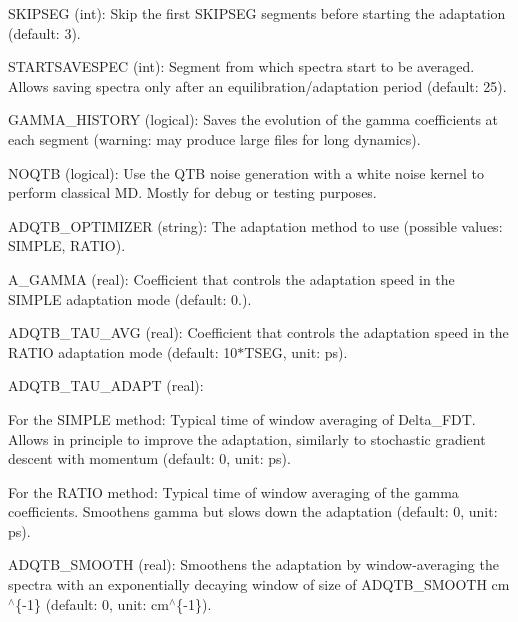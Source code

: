 \begin{DoxyItemize}
\item {\ttfamily S\-K\-I\-P\-S\-E\-G} (int)\-: Skip the first {\ttfamily S\-K\-I\-P\-S\-E\-G} segments before starting the adaptation (default\-: 3).
\item {\ttfamily S\-T\-A\-R\-T\-S\-A\-V\-E\-S\-P\-E\-C} (int)\-: Segment from which spectra start to be averaged. Allows saving spectra only after an equilibration/adaptation period (default\-: 25).
\item {\ttfamily G\-A\-M\-M\-A\-\_\-\-H\-I\-S\-T\-O\-R\-Y} (logical)\-: Saves the evolution of the gamma coefficients at each segment (warning\-: may produce large files for long dynamics).
\item {\ttfamily N\-O\-Q\-T\-B} (logical)\-: Use the Q\-T\-B noise generation with a white noise kernel to perform classical M\-D. Mostly for debug or testing purposes.
\item {\ttfamily A\-D\-Q\-T\-B\-\_\-\-O\-P\-T\-I\-M\-I\-Z\-E\-R} (string)\-: The adaptation method to use (possible values\-: {\ttfamily S\-I\-M\-P\-L\-E}, {\ttfamily R\-A\-T\-I\-O}).
\item {\ttfamily A\-\_\-\-G\-A\-M\-M\-A} (real)\-: Coefficient that controls the adaptation speed in the {\ttfamily S\-I\-M\-P\-L\-E} adaptation mode (default\-: 0.).
\item {\ttfamily A\-D\-Q\-T\-B\-\_\-\-T\-A\-U\-\_\-\-A\-V\-G} (real)\-: Coefficient that controls the adaptation speed in the {\ttfamily R\-A\-T\-I\-O} adaptation mode (default\-: 10$\ast${\ttfamily T\-S\-E\-G}, unit\-: ps).
\item {\ttfamily A\-D\-Q\-T\-B\-\_\-\-T\-A\-U\-\_\-\-A\-D\-A\-P\-T} (real)\-:
\begin{DoxyItemize}
\item For the {\ttfamily S\-I\-M\-P\-L\-E} method\-: Typical time of window averaging of Delta\-\_\-\-F\-D\-T. Allows in principle to improve the adaptation, similarly to stochastic gradient descent with momentum (default\-: 0, unit\-: ps).
\item For the {\ttfamily R\-A\-T\-I\-O} method\-: Typical time of window averaging of the gamma coefficients. Smoothens gamma but slows down the adaptation (default\-: 0, unit\-: ps).
\end{DoxyItemize}
\item {\ttfamily A\-D\-Q\-T\-B\-\_\-\-S\-M\-O\-O\-T\-H} (real)\-: Smoothens the adaptation by window-\/averaging the spectra with an exponentially decaying window of size of {\ttfamily A\-D\-Q\-T\-B\-\_\-\-S\-M\-O\-O\-T\-H} cm$^\wedge$\{-\/1\} (default\-: 0, unit\-: cm$^\wedge$\{-\/1\}).

\end{DoxyItemize}
